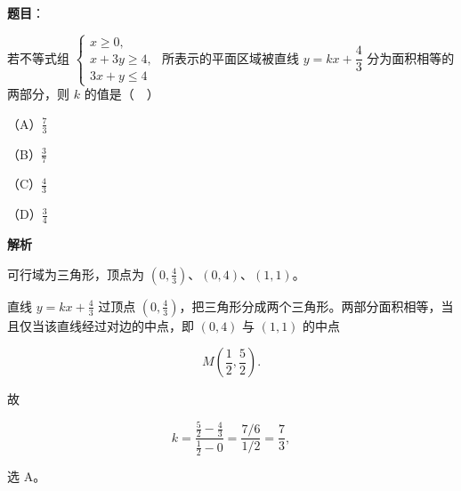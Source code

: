 \begin{answer}

\textbf{题目}：

若不等式组 $\begin{cases}x\geqslant0,\\ x+3y\geqslant4,\\ 3x+y\leqslant4\end{cases}$ 所表示的平面区域被直线 $y=kx+\dfrac43$ 分为面积相等的两部分，则 $k$ 的值是（　）

（A）$\frac73$

（B）$\frac37$

（C）$\frac43$

（D）$\frac34$

\textbf{解析}

可行域为三角形，顶点为 $\left(0,\frac43\right)$、$(0,4)$、$(1,1)$。

直线 $y=kx+\frac43$ 过顶点 $\left(0,\frac43\right)$，把三角形分成两个三角形。两部分面积相等，当且仅当该直线经过对边的中点，即 $(0,4)$ 与 $(1,1)$ 的中点

\nopagebreak[4]
\[M\left(\frac12,\frac52\right).\]

故

\nopagebreak[4]
\[k=\frac{\frac52-\frac43}{\frac12-0}=\frac{7/6}{1/2}=\frac73,\]

选 A。


\end{answer}

